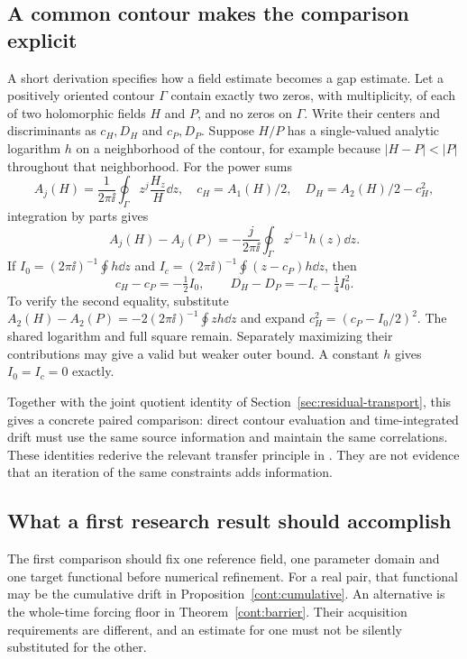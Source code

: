 \subsection{A common contour makes the comparison explicit}

A short derivation specifies how a field estimate becomes a gap estimate.
Let a positively oriented contour $\Gamma$ contain exactly two zeros,
with multiplicity, of each of two holomorphic fields $H$ and $P$, and
no zeros on $\Gamma$. Write their centers and discriminants as
$c_H,D_H$ and $c_P,D_P$. Suppose $H/P$ has a single-valued analytic
logarithm $h$ on a neighborhood of the contour, for example because
$|H-P|<|P|$ throughout that neighborhood. For the power sums
\[
 A_j(H)=\frac1{2\pi\ii}\oint_\Gamma z^j\frac{H_z}{H}\dd z,
 \quad c_H=A_1(H)/2,\quad D_H=A_2(H)/2-c_H^2,
\]
integration by parts gives
\begin{equation}
 A_j(H)-A_j(P)=-\frac{j}{2\pi\ii}
                 \oint_\Gamma z^{j-1}h(z)\dd z.
 \label{prog:log-moments}
\end{equation}
If
$I_0=(2\pi\ii)^{-1}\oint h\dd z$ and
$I_c=(2\pi\ii)^{-1}\oint(z-c_P)h\dd z$, then
\begin{equation}
 c_H-c_P=-\tfrac12 I_0,\qquad
 D_H-D_P=-I_c-\tfrac14 I_0^2.
 \label{prog:centered-error}
\end{equation}
To verify the second equality, substitute
$A_2(H)-A_2(P)=-2(2\pi\ii)^{-1}\oint zh\dd z$ and expand
$c_H^2=(c_P-I_0/2)^2$. The shared logarithm and full square remain.
Separately maximizing their contributions may give a valid but weaker
outer bound. A constant $h$ gives $I_0=I_c=0$ exactly.

Together with the joint quotient identity of
Section~\ref{sec:residual-transport}, this gives a concrete paired
comparison: direct contour evaluation and time-integrated drift must
use the same source information and maintain the same correlations.
These identities rederive the relevant transfer principle in
\cite[\S\S7,19--20]{VCDCMManuscript}. They are not evidence that an
iteration of the same constraints adds information.

\subsection{What a first research result should accomplish}

The first comparison should fix one reference field, one parameter domain
and one target functional before numerical refinement. For a real pair,
that functional may be the cumulative drift in
Proposition~\ref{cont:cumulative}. An alternative is the whole-time
forcing floor in Theorem~\ref{cont:barrier}. Their acquisition requirements
are different, and an estimate for one must not be silently substituted
for the other.

